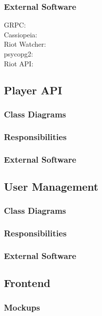 \subsubsection{External Software}
GRPC: \href{https://grpc.io/docs/languages/python/basics/}\\
Cassiopeia: \href{https://github.com/meraki-analytics/cassiopeia}\\
Riot Watcher: \href{https://github.com/pseudonym117/Riot-Watcher}\\
psycopg2: \href{https://pypi.org/project/psycopg2/}\\
Riot API: \href{https://developer.riotgames.com/}\\

\subsection{Player API}
\subsubsection{Class Diagrams}
\subsubsection{Responsibilities}
\subsubsection{External Software}
\subsection{User Management}
\subsubsection{Class Diagrams}
\subsubsection{Responsibilities}
\subsubsection{External Software}


\subsection{Frontend}

\subsubsection{Mockups}

